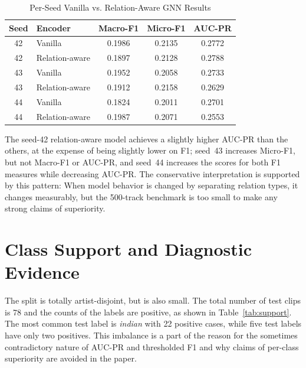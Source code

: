 \documentclass[conference]{IEEEtran}
\begin{document}
\begin{table}[t]
\caption{Per-Seed Vanilla vs. Relation-Aware GNN Results}
\label{tab:perseed}
\centering
\scriptsize
\setlength{\tabcolsep}{2.5pt}
\begin{tabular}{c l c c c}
\toprule
Seed & Encoder & Macro-F1 & Micro-F1 & AUC-PR\\
\midrule
42 & Vanilla & 0.1986 & 0.2135 & 0.2772\\
42 & Relation-aware & 0.1897 & 0.2128 & 0.2788\\
43 & Vanilla & 0.1952 & 0.2058 & 0.2733\\
43 & Relation-aware & 0.1912 & 0.2158 & 0.2629\\
44 & Vanilla & 0.1824 & 0.2011 & 0.2701\\
44 & Relation-aware & 0.1987 & 0.2071 & 0.2553\\
\bottomrule
\end{tabular}
\end{table}

The seed-42 relation-aware model achieves a slightly higher AUC-PR than the others, at the expense of being slightly lower on F1; seed~43 increases Micro-F1, but not Macro-F1 or AUC-PR, and seed~44 increases the scores for both F1 measures while decreasing AUC-PR. The conservative interpretation is supported by this pattern: When model behavior is changed by separating relation types, it changes measurably, but the 500-track benchmark is too small to make any strong claims of superiority.


\section{Class Support and Diagnostic Evidence}
The split is totally artist-disjoint, but is also small. The total number of test clips is 78 and the counts of the labels are positive, as shown in Table~\ref{tab:support}. The most common test label is \emph{indian} with 22 positive cases, while five test labels have only two positives. This imbalance is a part of the reason for the sometimes contradictory nature of AUC-PR and thresholded F1 and why claims of per-class superiority are avoided in the paper.
\end{document}
